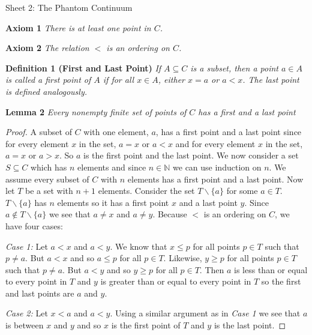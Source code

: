 \documentclass{article}
\begin{document}
\begin{flushleft}

\Large

Sheet 2: The Phantom Continuum\newline

\normalsize

\textbf{Axiom 1}
\textsl{There is at least one point in $C$.}\newline

\textbf{Axiom 2}
\textsl{The relation $<$ is an ordering on $C$.}\newline

\textbf{Definition 1 (First and Last Point)}
\textsl{If $A \subseteq C$ is a subset, then a point $a \in A$ is called a first point of $A$ if for all $x \in A$, either $x = a$ or $a < x$. The last point is defined analogously.}\newline

\textbf{Lemma 2}
\textsl{Every nonempty finite set of points of $C$ has a first and a last point}
\begin{proof}
A subset of $C$ with one element, $a$, has a first point and a last point since for every element $x$ in the set, $a=x$ or $a<x$ and for every element $x$ in the set, $a=x$ or $a>x$. So $a$ is the first point and the last point. We now consider a set $S \subseteq C$ which has $n$ elements and since $n \in \mathbb{N}$ we can use induction on $n$. We assume every subset of $C$ with $n$ elements has a first point and a last point. Now let $T$ be a set with $n+1$ elements. Consider the set $T \backslash \{a\}$ for some $a \in T$. $T \backslash \{a\}$ has $n$ elements so it has a first point $x$ and a last point $y$. Since $a \notin T \backslash \{a\}$ we see that $a \neq x$ and $a \neq y$. Because $<$ is an ordering on $C$, we have four cases:\newline

\textsl{Case 1:} Let $a<x$ and $a<y$. We know that $x \leq p$ for all points $p \in T$ such that $p \neq a$. But $a<x$ and so $a \leq p$ for all $p \in T$. Likewise, $y \geq p$ for all points $p \in T$ such that $p \neq a$. But $a<y$ and so $y \geq p$ for all $p \in T$. Then $a$ is less than or equal to every point in $T$ and $y$ is greater than or equal to every point in $T$ so the first and last points are $a$ and $y$.\newline

\textsl{Case 2:} Let $x<a$ and $a<y$. Using a similar argument as in \textit{Case 1} we see that $a$ is between $x$ and $y$ and so $x$ is the first point of $T$ and $y$ is the last point.\newline


\end{proof}
\end{flushleft}
\end{document}
